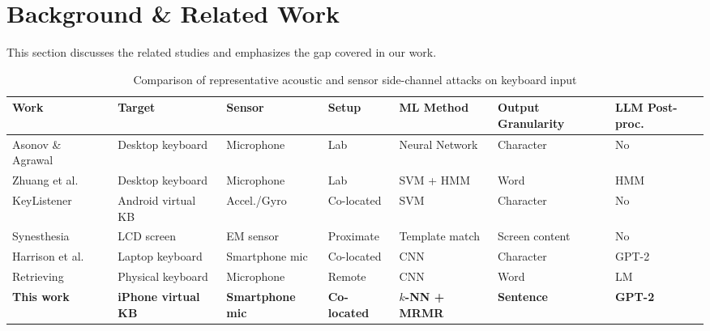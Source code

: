 \documentclass[conference]{IEEEtran}
\begin{document}




\section{Background \& Related Work} \label{sec:background}
This section discusses the related studies and emphasizes the gap covered in our work.
\begin{table}[!ht]
\centering
\caption{Comparison of representative acoustic and sensor side-channel attacks on keyboard input}
\label{tab:comparison}
\renewcommand{\arraystretch}{1.2}
\begin{tabular}{lllllll}
\toprule
\textbf{Work} & \textbf{Target} & \textbf{Sensor} & \textbf{Setup} & \textbf{ML Method} & \textbf{Output Granularity} & \textbf{LLM Post-proc.} \\
\midrule
Asonov \& Agrawal~\cite{asonov2004}   & Desktop keyboard  & Microphone   & Lab       & Neural Network      & Character          & No  \\
Zhuang et al.~\cite{zhuang2009keyboard}        & Desktop keyboard  & Microphone   & Lab       & SVM + HMM           & Word               & HMM \\
KeyListener~\cite{lu2019keylistener}           & Android virtual KB & Accel./Gyro & Co-located & SVM                & Character          & No  \\
Synesthesia~\cite{genkin2019synesthesia}       & LCD screen        & EM sensor    & Proximate  & Template match      & Screen content     & No  \\
Harrison et al.~\cite{harrison2023deep}            & Laptop keyboard   & Smartphone mic & Co-located & CNN               & Character          & GPT-2 \\
Retrieving~\cite{ieee2021touch}              & Physical keyboard  & Microphone   & Remote     & CNN                & Word               & LM  \\
\textbf{This work}                             & \textbf{iPhone virtual KB} & \textbf{Smartphone mic} & \textbf{Co-located} & \textbf{$k$-NN + MRMR} & \textbf{Sentence} & \textbf{GPT-2} \\
\bottomrule
\end{tabular}
\end{table}
\end{document}
